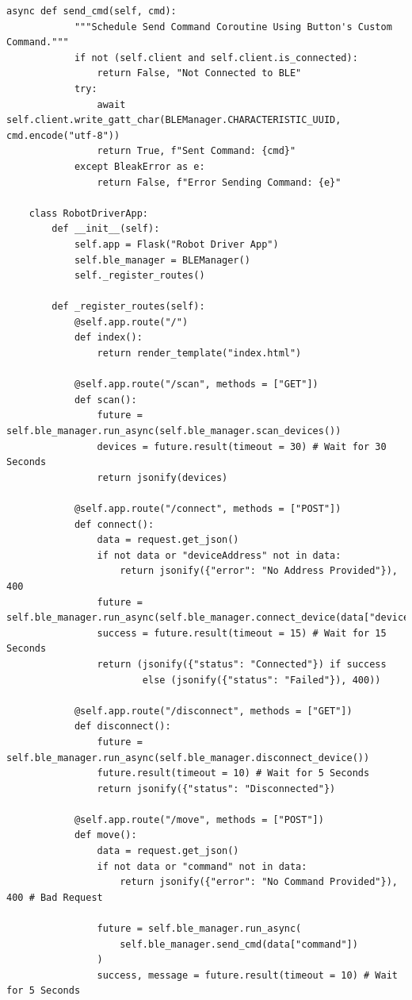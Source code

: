 \documentclass{article}
\begin{document}
\begin{lstlisting}[caption={Source Code : Robot Driver App}, label={lst:driver_app_code}]
        async def send_cmd(self, cmd):
            """Schedule Send Command Coroutine Using Button's Custom Command."""
            if not (self.client and self.client.is_connected):
                return False, "Not Connected to BLE"
            try:
                await self.client.write_gatt_char(BLEManager.CHARACTERISTIC_UUID, cmd.encode("utf-8"))
                return True, f"Sent Command: {cmd}"
            except BleakError as e:
                return False, f"Error Sending Command: {e}"

    class RobotDriverApp:
        def __init__(self):
            self.app = Flask("Robot Driver App")
            self.ble_manager = BLEManager()
            self._register_routes()

        def _register_routes(self):
            @self.app.route("/")
            def index():
                return render_template("index.html")

            @self.app.route("/scan", methods = ["GET"])
            def scan():
                future = self.ble_manager.run_async(self.ble_manager.scan_devices())
                devices = future.result(timeout = 30) # Wait for 30 Seconds
                return jsonify(devices)

            @self.app.route("/connect", methods = ["POST"])
            def connect():
                data = request.get_json()
                if not data or "deviceAddress" not in data:
                    return jsonify({"error": "No Address Provided"}), 400
                future = self.ble_manager.run_async(self.ble_manager.connect_device(data["deviceAddress"]))
                success = future.result(timeout = 15) # Wait for 15 Seconds
                return (jsonify({"status": "Connected"}) if success
                        else (jsonify({"status": "Failed"}), 400))

            @self.app.route("/disconnect", methods = ["GET"])
            def disconnect():
                future = self.ble_manager.run_async(self.ble_manager.disconnect_device())
                future.result(timeout = 10) # Wait for 5 Seconds
                return jsonify({"status": "Disconnected"})

            @self.app.route("/move", methods = ["POST"])
            def move():
                data = request.get_json()
                if not data or "command" not in data:
                    return jsonify({"error": "No Command Provided"}), 400 # Bad Request

                future = self.ble_manager.run_async(
                    self.ble_manager.send_cmd(data["command"])
                )
                success, message = future.result(timeout = 10) # Wait for 5 Seconds


\end{lstlisting}
\end{document}
